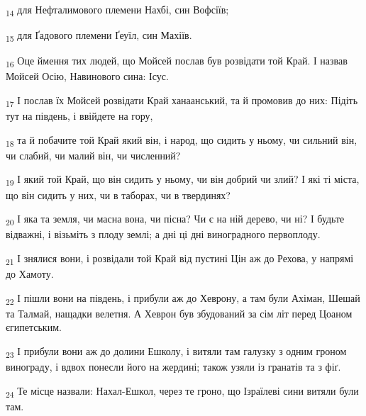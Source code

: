 \begin{tcolorbox}
\textsubscript{14} для Нефталимового племени Нахбі, син Вофсіїв;
\end{tcolorbox}
\begin{tcolorbox}
\textsubscript{15} для Ґадового племени Ґеуїл, син Махіїв.
\end{tcolorbox}
\begin{tcolorbox}
\textsubscript{16} Оце ймення тих людей, що Мойсей послав був розвідати той Край. І назвав Мойсей Осію, Навинового сина: Ісус.
\end{tcolorbox}
\begin{tcolorbox}
\textsubscript{17} І послав їх Мойсей розвідати Край ханаанський, та й промовив до них: Підіть тут на південь, і ввійдете на гору,
\end{tcolorbox}
\begin{tcolorbox}
\textsubscript{18} та й побачите той Край який він, і народ, що сидить у ньому, чи сильний він, чи слабий, чи малий він, чи численний?
\end{tcolorbox}
\begin{tcolorbox}
\textsubscript{19} І який той Край, що він сидить у ньому, чи він добрий чи злий? І які ті міста, що він сидить у них, чи в таборах, чи в твердинях?
\end{tcolorbox}
\begin{tcolorbox}
\textsubscript{20} І яка та земля, чи масна вона, чи пісна? Чи є на ній дерево, чи ні? І будьте відважні, і візьміть з плоду землі; а дні ці дні виноградного первоплоду.
\end{tcolorbox}
\begin{tcolorbox}
\textsubscript{21} І знялися вони, і розвідали той Край від пустині Цін аж до Рехова, у напрямі до Хамоту.
\end{tcolorbox}
\begin{tcolorbox}
\textsubscript{22} І пішли вони на південь, і прибули аж до Хеврону, а там були Ахіман, Шешай та Талмай, нащадки велетня. А Хеврон був збудований за сім літ перед Цоаном єгипетським.
\end{tcolorbox}
\begin{tcolorbox}
\textsubscript{23} І прибули вони аж до долини Ешколу, і витяли там галузку з одним гроном винограду, і вдвох понесли його на жердині; також узяли із гранатів та з фіґ.
\end{tcolorbox}
\begin{tcolorbox}
\textsubscript{24} Те місце назвали: Нахал-Ешкол, через те гроно, що Ізраїлеві сини витяли були там.
\end{tcolorbox}
